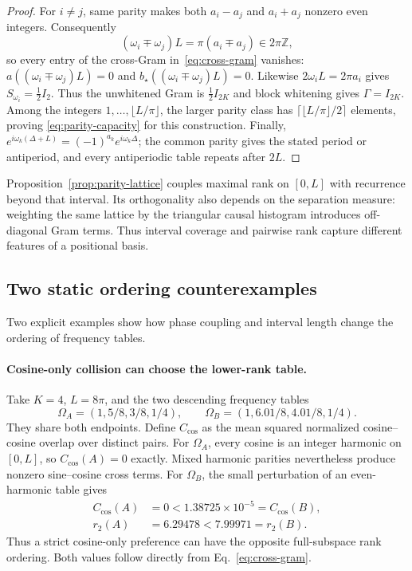 \begin{proof}
For $i\ne j$, same parity makes both $a_i-a_j$ and $a_i+a_j$ nonzero even
integers.  Consequently
\begin{equation}
(\omega_i\!\mp\!\omega_j)L=\pi(a_i\!\mp\!a_j)\in2\pi\mathbb Z,
\end{equation}
so every entry of the cross-Gram in~\eqref{eq:cross-gram} vanishes:
$a((\omega_i\mp\omega_j)L)=0$ and
$b_\star((\omega_i\mp\omega_j)L)=0$.  Likewise
$2\omega_iL=2\pi a_i$ gives $S_{\omega_i}=\tfrac12I_2$.
Thus the unwhitened Gram is $\tfrac12I_{2K}$ and block whitening gives
$\Gamma=I_{2K}$.  Among the integers
$1,\ldots,\lfloor L/\pi\rfloor$, the larger parity class has
$\lceil\lfloor L/\pi\rfloor/2\rceil$ elements, proving
\eqref{eq:parity-capacity} for this construction.  Finally,
$e^{i\omega_k(\Delta+L)}=(-1)^{a_k}e^{i\omega_k\Delta}$; the common parity
gives the stated period or antiperiod, and every antiperiodic table repeats
after $2L$.
\end{proof}

Proposition~\ref{prop:parity-lattice} couples maximal rank on $[0,L]$ with
recurrence beyond that interval. Its orthogonality also depends on the
separation measure: weighting the same lattice by the triangular causal
histogram introduces off-diagonal Gram terms. Thus interval coverage and
pairwise rank capture different features of a positional basis.

\FloatBarrier
\subsection{Two static ordering counterexamples}
\label{sec:static-counterexamples}

Two explicit examples show how phase coupling and interval length change
the ordering of frequency tables.

\paragraph{Cosine-only collision can choose the lower-rank table.}
Take $K=4$, $L=8\pi$, and the two descending frequency tables
\[
\Omega_A=(1,5/8,3/8,1/4),\qquad
\Omega_B=(1,6.01/8,4.01/8,1/4).
\]
They share both endpoints. Define $C_{\cos}$ as the mean squared normalized
cosine--cosine overlap over distinct pairs. For $\Omega_A$, every cosine is
an integer harmonic on $[0,L]$, so $C_{\cos}(A)=0$ exactly. Mixed harmonic
parities nevertheless produce nonzero sine--cosine cross terms. For
$\Omega_B$, the small perturbation of an even-harmonic table gives
\begin{align}
C_{\cos}(A)&=0 < 1.38725\times10^{-5}=C_{\cos}(B),\\
r_2(A)&=6.29478 < 7.99971=r_2(B).
\label{eq:cosine-order-counterexample}
\end{align}
Thus a strict cosine-only preference can have the opposite full-subspace
rank ordering. Both values follow directly from Eq.~\eqref{eq:cross-gram}.

